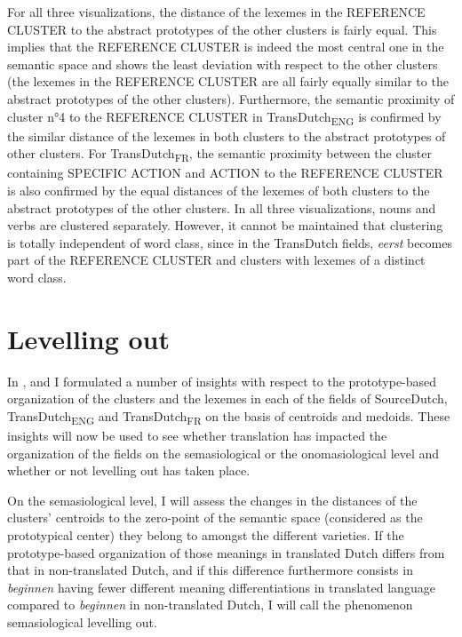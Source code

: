 For all three visualizations, the distance of the lexemes in the REFERENCE CLUSTER to the abstract prototypes of the other clusters is fairly equal. This implies that the REFERENCE CLUSTER is indeed the most central one in the semantic space and shows the least deviation with respect to the other clusters (the lexemes in the REFERENCE CLUSTER are all fairly equally similar to the abstract prototypes of the other clusters). Furthermore, the semantic proximity of cluster n°4 to the REFERENCE CLUSTER in TransDutch\textsubscript{ENG} is confirmed by the similar distance of the lexemes in both clusters to the abstract prototypes of other clusters. For TransDutch\textsubscript{FR}, the semantic proximity between the cluster containing {SPECIFIC} ACTION and ACTION to the REFERENCE CLUSTER is also confirmed by the equal distances of the lexemes of both clusters to the abstract prototypes of the other clusters. In all three visualizations, nouns and verbs are clustered separately. However, it cannot be maintained that clustering is totally independent of word class, since in the TransDutch fields, \textit{eerst} becomes part of the REFERENCE CLUSTER and clusters with lexemes of a distinct word class.

\section{Levelling out}
\label{sec:4.5}  
In ,  and  I formulated a number of insights with respect to the prototype-based organization of the clusters and the lexemes in each of the fields of SourceDutch, TransDutch\textsubscript{ENG} and TransDutch\textsubscript{FR} on the basis of centroids and medoids. These insights will now be used to see whether translation has impacted the organization of the fields on the semasiological or the onomasiological level and whether or not levelling out has taken place.

On the semasiological level, I will assess the changes in the distances of the clusters’ centroids to the zero-point of the semantic space (considered as the prototypical center) they belong to amongst the different varieties. If the prototype-based organization of those meanings in translated Dutch differs from that in non-translated Dutch, and if this difference furthermore consists in \textit{beginnen} having fewer different meaning differentiations in translated language compared to \textit{beginnen} in non-translated Dutch, I will call the phenomenon semasiological levelling out.


